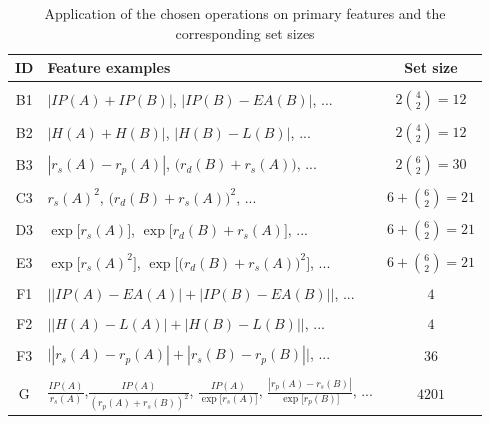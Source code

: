 \documentclass[11pt,oneside,czech,american]{book} %
\theoremstyle{plain}
\theoremstyle{definition}
\begin{document}
\begin{table}[h]
	\centering
	\begin{tabular}{clc}
		\hline
		ID & Feature examples~ ~                                                                                        & Set size  \\
		\hline
		&&\\ [-1em]
		B1 & $|IP(A)+IP(B)|$, $|IP(B) - EA(B)|$, ...                                                                      & $2\binom{4}{2} = 12$   \\
		
		&&\\ [-1em]
		B2 & $|H(A)+H(B)|$, $|H(B) - L(B)|$, ...                                                                                      & $2\binom{4}{2} = 12$   \\
		
		&&\\ [-1em]
		B3 & $|r_s(A) - r_p(A)|$, $\big(r_d(B) + r_s(A)\big)$, ... & $2\binom{6}{2} = 30$  \\
		
		&&\\ [-1em]
		C3 & $r_s(A)^2$, $\big(r_d(B) + r_s(A)\big)^2$, ...                                                                      & $6+\binom{6}{2}=21$   \\
		
		&&\\ [-1em]
		D3 & $\exp\big[r_s(A)\big]$, $ \exp\big[r_d(B) + r_s(A)\big]$, ...                                                                      & $6+\binom{6}{2}=21$   \\
		
		&&\\ [-1em]
		E3 & $\exp\big[r_s(A)^2\big]$, $\exp\big[\big(r_d(B) + r_s(A)\big)^2 \big]$, ...                                                                      & $6+\binom{6}{2}=21$   \\
		
		&&\\ [-1em]
		F1 & $\big||IP(A)-EA(A)|+|IP(B)-EA(B)|\big|$, ...                                                                      & $4$   \\ 
		
		&&\\ [-1em]
		F2 & $\big||H(A)-L(A)|+|H(B)-L(B)|\big|$, ...                                                                      & $4$   \\ 
		
		&&\\ [-1em]
		F3 & $\big||r_s(A)-r_p(A)|+|r_s(B)-r_p(B)|\big|$, ...                                                                      & $36$   \\
		
		&&\\ [-1em]
		G & $\frac{IP(A)}{r_s(A)}$,$\frac{IP(A)}{(r_p(A)+r_s(B))^2}$, $\frac{IP(A)}{\exp\big[r_s(A)\big]}$, $\frac{|r_p(A)-r_s(B)|}{\exp\big[r_p(B)\big]}$, ...                                                                      & $4201$   \\
		\hline
	\end{tabular}
	\caption{Application of the chosen operations on primary features and the corresponding set sizes}
	\label{descriptors}
\end{table}
\end{document}
